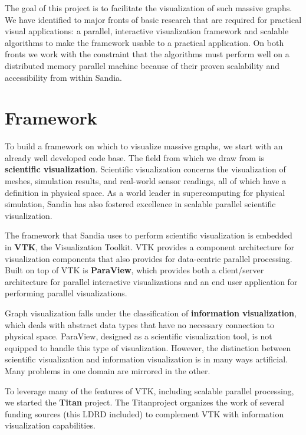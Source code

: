 \documentclass[pdf,12pt,report,strict]{SANDreport}
\newcommand{\titan}{Titan}
\newcommand*{\keyterm}[1]{\textbf{#1}}
\begin{document}
The goal of this project is to facilitate the visualization of such massive
graphs.  We have identified to major fronts of basic research that are
required for practical visual applications: a parallel, interactive
visualization framework and scalable algorithms to make the framework
usable to a practical application.  On both fronts we work with the
constraint that the algorithms must perform well on a distributed memory
parallel machine because of their proven scalability and accessibility
from within Sandia.

\section{Framework}

To build a framework on which to visualize massive graphs, we start with an
already well developed code base.  The field from which we draw from is
\keyterm{scientific visualization}.
Scientific visualization concerns the visualization of meshes, simulation
results, and real-world sensor readings, all of which have a definition in
physical space.  As a world leader in supercomputing for physical
simulation, Sandia has also fostered excellence in scalable parallel
scientific visualization.


The framework that Sandia uses to perform scientific visualization is
embedded in \keyterm{VTK}, the Visualization Toolkit.  VTK
provides a component architecture for visualization components that also
provides for data-centric parallel processing.  Built on top of VTK is
\keyterm{ParaView}, which provides both a client/server
architecture for parallel interactive visualizations and an end user
application for performing parallel visualizations.

Graph visualization falls under the classification of
\keyterm{information visualization}, which
deals with abstract data types that have no necessary connection to
physical space.  ParaView, designed as a scientific visualization tool, is
not equipped to handle this type of visualization.  However, the distinction
between scientific visualization and information visualization is in many
ways artificial.  Many problems in one domain are mirrored in the other.

To leverage many of the features of VTK, including scalable parallel
processing, we started the \index{Titan@\titan}\keyterm{\titan} project.
The \titan project organizes the work of several funding sources (this LDRD
included) to complement VTK with information visualization capabilities.
\end{document}
